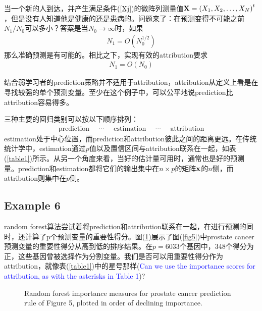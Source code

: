 \documentclass[lang=cn,11pt,a4paper,cite=authoryear]{elegantpaper}
\begin{document}
当一个新的人到达，并产生满足条件(\ref{Xj})的微阵列测量值$\bold{X}=\left(X_{1}, X_{2}, \ldots, X_{N}\right)^{t}$，但是没有人知道他是健康的还是患病的。问题来了：在预测变得不可能之前$N_1/N_0$可以多小？答案是当$N_0 \rightarrow \infty$时，如果
\begin{align}
N_{1}=O\left(N_{0}^{1 / 2}\right)
\end{align}
那么准确预测是有可能的。相比之下，实现有效的attribution要求
\begin{align}
N_{1}=O\left(N_{0}\right)
\end{align}

结合弱学习者的prediction策略并不适用于attribution，attribution从定义上看是在寻找较强的单个预测变量。至少在这个例子中，可以公平地说prediction比attribution容易得多。

三种主要的回归类别可以按以下顺序排列：
\begin{align}
\text { prediction } \quad \cdots \quad \text { estimation } \quad \cdots \quad \text { attribution }
\end{align}
estimation处于中心位置，而prediction和attribution彼此之间的距离更远。在传统统计学中，estimation通过$p$值以及置信区间与attribution联系在一起，如表(\ref{table1})所示。从另一个角度来看，当好的估计量可用时，通常也是好的预测量。prediction和estimation都将它们的输出集中在$n\times p$的矩阵$\bold{x}$的$n$侧，而attribution则集中在$p$侧。

\subsection{Example 6}

random forest算法尝试着将prediction和attribution联系在一起，在进行预测的同时，还计算了p个预测变量的重要性得分。图(\ref{fig7})展示了图(\ref{fig5})中prostate cancer预测变量的重要性得分从高到低的排序结果。在$p=6033$个基因中，348个得分为正，这些基因曾被选择作为分割变量。我们是否可以用重要性得分作为attribution，就像表(\ref{table1})中的星号那样(\textcolor{blue}{Can we use the importance scores for attribution, as with the asterisks in Table 1})?

\begin{figure}[H]
		\centering
		\caption{Random forest importance measures for prostate cancer prediction rule of Figure 5, plotted in order of declining importance.}
		\label{fig7}
\end{figure}
\end{document}

